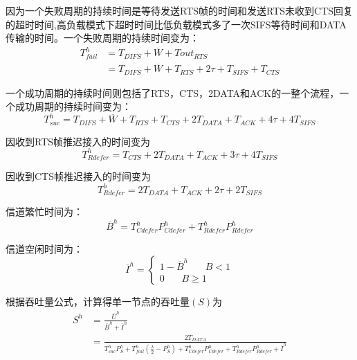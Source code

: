 因为一个失败周期的持续时间是等待发送RTS帧的时间和发送RTS未收到CTS回复的超时时间,高负载模式下超时时间比低负载模式多了一次SIFS等待时间和DATA传输的时间。一个失败周期的持续时间变为：
\begin{equation}
\begin{aligned}
T_{fail}^h&=T_{DIFS}+\overline W+Tout_{RTS}\\
&=T_{DIFS}+\overline W+T_{RTS}+2\tau+T_{SIFS}+T_{CTS}
\end{aligned}
\end{equation}

一个成功周期的持续时间则包括了RTS，CTS，2DATA和ACK的一整个流程，一个成功周期的持续时间变为：
\begin{equation}
T_{suc}^h=T_{DIFS}+\overline W+T_{RTS}+T_{CTS}+2T_{DATA}+T_{ACK}+4\tau+4T_{SIFS}
\end{equation}

因收到RTS帧推迟接入的时间变为
\begin{equation}
T_{Rdefer}^h=T_{CTS}+2T_{DATA}+T_{ACK}+3\tau+4T_{SIFS}
\end{equation}

因收到CTS帧推迟接入的时间变为
\begin{equation}
T_{Rdefer}^h=2T_{DATA}+T_{ACK}+2\tau+2T_{SIFS}
\end{equation}

信道繁忙时间为：
\begin{equation}
\overline B^h=T_{Cdefer}^hP_{Cdefer}^h+T_{Rdefer}^hP_{Rdefer}^h
\end{equation}

信道空闲时间为：
\begin{equation}
\overline I^h=\left\{
\begin{aligned}
1-\overline B^h \ \ \ \ \ \ \ \ B<1\\
0\ \ \ \ \ \ \ \    B\ge 1
\end{aligned}
\right.
\end{equation}

根据吞吐量公式，计算得单一节点的吞吐量$(S)$为
\begin{equation}
\begin{aligned}
S^h&=\frac{\overline U^h}{\overline B^h+\overline I^h}\\&=\frac{2T_{DATA}}{ T_{suc}^h P_S^h+T_{fail}^h(\frac{\lambda}{2}-P_S^h )+ T_{Cdefer}^hP_{Cdefer}^h+T_{Rdefer}^hP_{Rdefer}^h+\overline I^h}
\end{aligned}
\end{equation}

\endinput